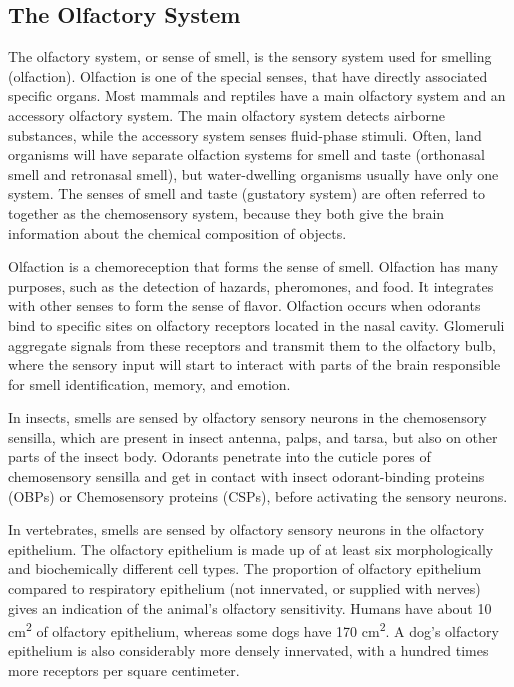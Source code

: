 \hypertarget{the-olfactory-system}{%
\subsection{The Olfactory System}\label{the-olfactory-system}}

The olfactory system, or sense of smell, is the sensory system used for
smelling (olfaction). Olfaction is one of the special senses, that have
directly associated specific organs. Most mammals and reptiles have a
main olfactory system and an accessory olfactory system. The main
olfactory system detects airborne substances, while the accessory system
senses fluid-phase stimuli. Often, land organisms will have separate
olfaction systems for smell and taste (orthonasal smell and retronasal
smell), but water-dwelling organisms usually have only one system. The
senses of smell and taste (gustatory system) are often referred to
together as the chemosensory system, because they both give the brain
information about the chemical composition of objects.

Olfaction is a chemoreception that forms the sense of smell. Olfaction
has many purposes, such as the detection of hazards, pheromones, and
food. It integrates with other senses to form the sense of flavor.
Olfaction occurs when odorants bind to specific sites on olfactory
receptors located in the nasal cavity. Glomeruli aggregate signals from
these receptors and transmit them to the olfactory bulb, where the
sensory input will start to interact with parts of the brain responsible
for smell identification, memory, and emotion.

In insects, smells are sensed by olfactory sensory neurons in the
chemosensory sensilla, which are present in insect antenna, palps, and
tarsa, but also on other parts of the insect body. Odorants penetrate
into the cuticle pores of chemosensory sensilla and get in contact with
insect odorant-binding proteins (OBPs) or Chemosensory proteins (CSPs),
before activating the sensory neurons.

In vertebrates, smells are sensed by olfactory sensory neurons in the
olfactory epithelium. The olfactory epithelium is made up of at least
six morphologically and biochemically different cell types. The
proportion of olfactory epithelium compared to respiratory epithelium
(not innervated, or supplied with nerves) gives an indication of the
animal's olfactory sensitivity. Humans have about 10
cm\textsuperscript{2} of olfactory epithelium, whereas some dogs have
170 cm\textsuperscript{2}. A dog's olfactory epithelium is also
considerably more densely innervated, with a hundred times more
receptors per square centimeter.


